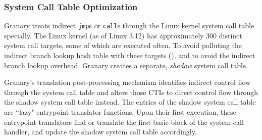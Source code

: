 \documentclass[preprint]{sigplanconf}
\begin{document}

\subsubsection{System Call Table Optimization}

Granary treats indirect \texttt{jmp}s or \texttt{call}s through the Linux kernel system call table specially. The Linux kernel (as of Linux 3.12) has approximately 300 distinct system call targets, some of which are executed often. To avoid polluting the indirect branch lookup hash table with these targets (), and to avoid the indirect branch lookup overhead, Granary creates a separate, \emph{shadow} system call table.


Granary's translation post-processing mechanism identifies indirect control flow through the system call table and alters those CTIs to direct control flow through the shadow system call table instead. The entries of the shadow system call table are ``lazy" entrypoint translator functions. Upon their first execution, these entrypoint translators find or translate the first basic block of the system call handler, and update the shadow system call table accordingly. 

\end{document}
